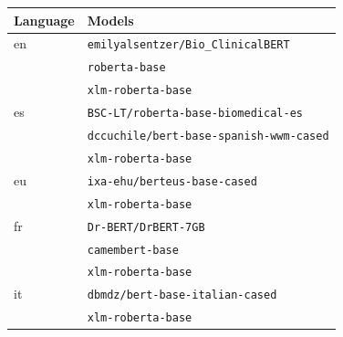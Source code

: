 \begin{tabular}{@{}ll@{}}%
\toprule%
Language&Models\\%
\midrule%
en&\verb|emilyalsentzer/Bio_ClinicalBERT| \citep{Alsentzer2019PubliclyEmbeddings}\\%
&\verb|roberta-base| \citep{Liu2019RoBERTa:Approach}\\%
&\verb|xlm-roberta-base| \citep{Conneau2019UnsupervisedScale} \\%
\midrule%
es&\verb|BSC-LT/roberta-base-biomedical-es| \citep{Carrino2022PretrainedSpanish}\\%
&\verb|dccuchile/bert-base-spanish-wwm-cased| \citep{Ca2020SPANISHDATA}\\%
&\verb|xlm-roberta-base| \\%
\midrule%
eu&\verb|ixa-ehu/berteus-base-cased| \citep{Agerri2020GiveBasque}\\%
&\verb|xlm-roberta-base| \\%
\midrule%
fr&\verb|Dr-BERT/DrBERT-7GB| \citep{Labrak2023DrBERT:Domains}\\%
&\verb|camembert-base| \citep{Martin2019CamemBERT:Model}\\%
&\verb|xlm-roberta-base| \\%
\midrule%
it&\verb|dbmdz/bert-base-italian-cased| \citep{Schweter2020ItalianModels}\\%
&\verb|xlm-roberta-base| \\\bottomrule%
%
\end{tabular}